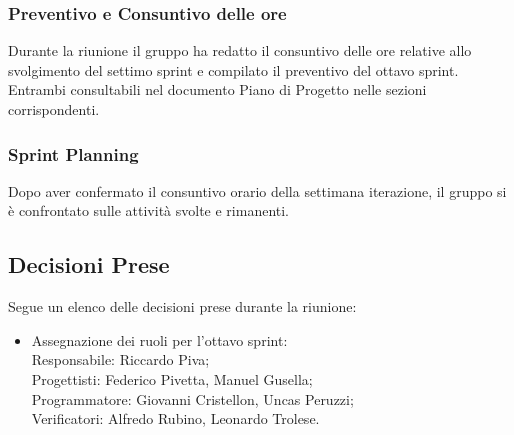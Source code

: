\documentclass[10pt]{article}
\begin{document}
\subsubsection{Preventivo e Consuntivo delle ore}
Durante la riunione il gruppo ha redatto il consuntivo delle ore relative allo svolgimento del settimo sprint e compilato il preventivo del ottavo sprint. Entrambi consultabili nel documento Piano di Progetto nelle sezioni corrispondenti.\\

\subsubsection{Sprint Planning}
Dopo aver confermato il consuntivo orario della settimana iterazione, il gruppo si è confrontato sulle attività svolte e rimanenti.


\subsection{Decisioni Prese}
Segue un elenco delle decisioni prese durante la riunione:
\begin{itemize}
    \item   Assegnazione dei ruoli per l'ottavo sprint:\\
            Responsabile: Riccardo Piva;\\
            Progettisti: Federico Pivetta, Manuel Gusella;\\
            Programmatore: Giovanni Cristellon, Uncas Peruzzi;\\
            Verificatori: Alfredo Rubino, Leonardo Trolese.
\end{itemize}
\end{document}
